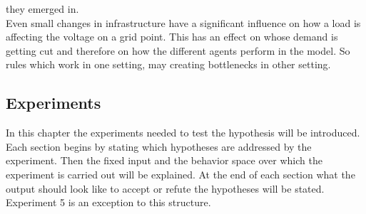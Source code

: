 \documentclass[a4paper]{article}
\begin{document}
\begin{enumerate}
\begin{enumerate}
{                                      they emerged in.} \\
                                      Even small changes in infrastructure have a significant influence on how
                                      a load is affecting the voltage on a grid point. This has an effect on
                                      whose demand is getting cut and therefore on how the different agents 
                                      perform in the model. So rules which work in one setting, may creating 
                                      bottlenecks in other setting.

                                     \end{enumerate}
\end{enumerate}

\subsection{Experiments}
In this chapter the experiments needed to test the hypothesis will be introduced. Each section begins by stating
which hypotheses are addressed by the experiment. Then the fixed input and the behavior space over which the
experiment is carried out will be explained. At the end of each section what the output should look like to
accept or refute the hypotheses will be stated. Experiment  5 is an exception to this structure.
\end{document}
